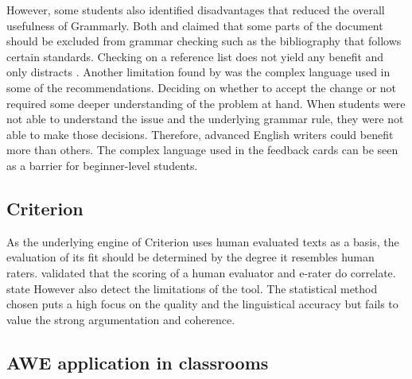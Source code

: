 \documentclass[runningheads]{llncs}
\let\OldTextregistered\textregistered
\renewcommand{\textregistered}{\OldTextregistered\xspace}%
\begin{document}
However, some students also identified disadvantages that reduced the overall usefulness of Grammarly\textregistered. Both \textcite{ventayen_graduate_2018} and  \textcite{nova_utilizing_2018} claimed that some parts of the document should be excluded from grammar checking such as the bibliography that follows certain standards. Checking on a reference list does not yield any benefit and only distracts \citep{ventayen_graduate_2018, nova_utilizing_2018}. Another limitation found by \textcite{cavaleri_you_2016} was the complex language used in some of the recommendations. Deciding on whether to accept the change or not required some deeper understanding of the problem at hand. When students were not able to understand the issue and the underlying grammar rule, they were not able to make those decisions. Therefore, advanced English writers could benefit more than others. The complex language used in the feedback cards can be seen as a barrier for beginner-level students. 

\subsection{Criterion\textregistered}
As the underlying engine of Criterion\textregistered uses human evaluated texts as a basis, the evaluation of its fit should be determined by the degree it resembles human raters. \textcite{weigle_validation_2010} validated that the scoring of a human evaluator and e-rater\textregistered do correlate. \citeauthor{lim_review_2012} state  However \textcite{lim_review_2012} also detect the limitations of the tool. The statistical method chosen puts a high focus on the quality and the linguistical accuracy but fails to value the strong argumentation and coherence. 

\subsection{AWE application in classrooms}
\end{document}
